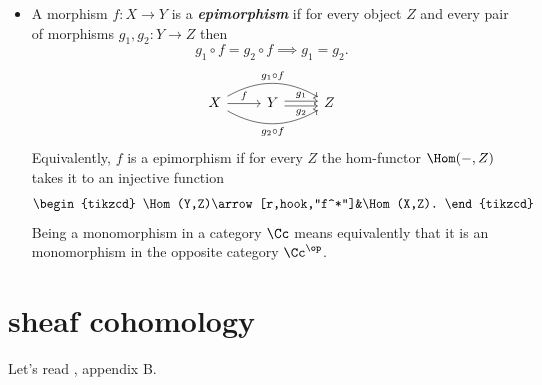 \begin{defn}
\begin{itemize}
		\item A morphism $f:X\to Y$ is a \textbf{\textit{epimorphism}} if for every object $Z$ and every pair of morphisms $g_1,g_2:Y\to Z$ then
		\[g_1\circ f=g_2\circ f\implies g_1=g_2.\]
		\[\begin{tikzcd}
			X\arrow[r,"f"]\arrow[rr,bend right,swap,"g_2\circ f"]\arrow[rr,bend left,"g_1\circ f"]&Y\arrow[r,shift={(0,.06)},"g_1"]\arrow[r,swap,shift={(0,-.06)},"g_2"]&Z
		\end{tikzcd}\]
		Equivalently, $f$ is a epimorphism if for every $Z$ the hom-functor $\Hom(-,Z)$ takes it to an injective function
		\[\begin{tikzcd}
			\Hom(Y,Z)\arrow[r,hook,"f^*"]&\Hom(X,Z).
		\end{tikzcd}\]
		Being a monomorphism in a category $\Cc$ means equivalently that it is an monomorphism in the opposite category $\Cc^{\op}$.
	\end{itemize}
\end{defn}
\section{sheaf cohomology}
Let's read \cite{huybrechts}, appendix B.

